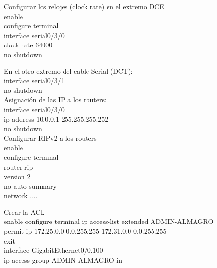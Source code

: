 \documentclass[a4paper,16pt]{article}
\begin{document}
\vspace{1cm}
Configurar los relojes (clock rate) en el extremo DCE\\
enable \\
configure terminal \\
interface serial0/3/0 \\
clock rate 64000 \\
no shutdown

En el otro extremo del cable Serial (DCT): \\
interface serial0/3/1 \\
no shutdown \\

Asignación de las IP a los routers: \\
interface serial0/3/0 \\
ip address 10.0.0.1 255.255.255.252 \\
no shutdown \\

Configurar RIPv2 a los routers \\
enable \\
configure terminal \\
router rip \\
version 2 \\
no auto-summary \\
network ....

Crear la ACL \\
enable
configure terminal
ip access-list extended ADMIN-ALMAGRO \\
permit ip 172.25.0.0 0.0.255.255 172.31.0.0 0.0.255.255 \\
exit \\
interface GigabitEthernet0/0.100 \\
ip access-group ADMIN-ALMAGRO in \\
\end{document}

